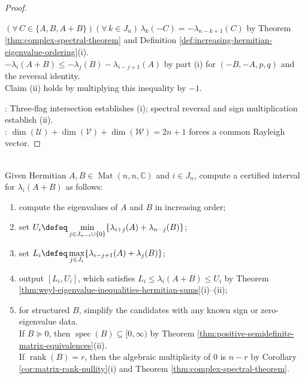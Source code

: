 \begin{theorem}
\begin{proof}
\begin{enumerate}[label=(\roman*)]
$(\forall\,C\in\{A,B,A+B\})(\forall\,k\in J_n)\,\lambda_k(-C)=-\lambda_{n-k+1}(C)$ by Theorem \ref{thm:complex-spectral-theorem} and Definition \ref{def:increasing-hermitian-eigenvalue-ordering}(i).\\
$-\lambda_i(A+B)\leq-\lambda_j(B)-\lambda_{i-j+1}(A)$ by part (i) for $(-B,-A,p,q)$ and the reversal identity.\\
Claim (ii) holds by multiplying this inequality by $-1$.
\end{enumerate}
: Three-flag intersection establishes (i); spectral reversal and sign multiplication establish (ii).\\
: $\dim(\mathcal{U})+\dim(\mathcal{V})+\dim(\mathcal{W})=2n+1$ forces a common Rayleigh vector.
\end{proof}
\end{theorem}

\begin{computationmethod} \label{meth:weyl-inequality-method} \\
Given Hermitian $A,B\in\operatorname{Mat}(n,n,\mathbb{C})$ and $i\in J_n$, compute a certified interval for $\lambda_i(A+B)$ as follows:
\begin{enumerate}[label=(\roman*)]
\setlength{\itemsep}{0pt}
\item compute the eigenvalues of $A$ and $B$ in increasing order;
\item set $U_i\defeq\min\limits_{j\in J_{n-i}\cup\{0\}}\{\lambda_{i+j}(A)+\lambda_{n-j}(B)\}$;
\item set $L_i\defeq\max\limits_{j\in J_i}\{\lambda_{i-j+1}(A)+\lambda_j(B)\}$;
\item output $[L_i,U_i]$, which satisfies $L_i\leq\lambda_i(A+B)\leq U_i$ by Theorem \ref{thm:weyl-eigenvalue-inequalities-hermitian-sums}(i)--(ii);
\item for structured $B$, simplify the candidates with any known sign or zero-eigenvalue data.\\
If $B\succeq0$, then $\operatorname{spec}(B)\subseteq[0,\infty)$ by Theorem \ref{thm:positive-semidefinite-matrix-equivalences}(ii).\\
If $\operatorname{rank}(B)=r$, then the algebraic multiplicity of $0$ is $n-r$ by Corollary \ref{cor:matrix-rank-nullity}(i) and Theorem \ref{thm:complex-spectral-theorem}.
\end{enumerate}
\end{computationmethod}

